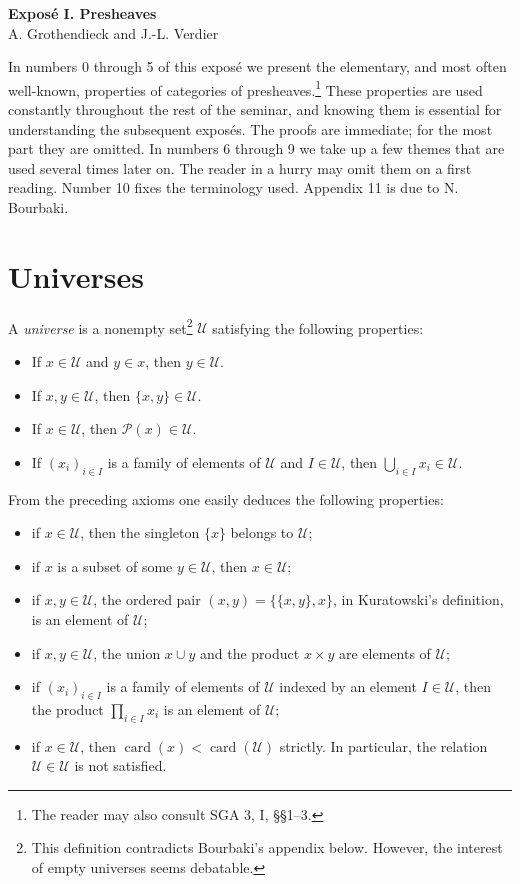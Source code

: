 \documentclass[11pt]{article}
\newcommand{\U}{\mathcal{U}}
\newcommand{\card}{\operatorname{card}}
\newcommand{\Pow}{\mathcal{P}}
\theoremstyle{definition}
\begin{document}
\begin{center}
{\Large \textbf{Exposé I. Presheaves}}\\[0.5em]
A. Grothendieck and J.-L. Verdier
\end{center}

\bigskip

In numbers 0 through 5 of this exposé we present the elementary, and most often well-known, properties of categories of presheaves.\footnote{The reader may also consult SGA 3, I, \S\S 1--3.} These properties are used constantly throughout the rest of the seminar, and knowing them is essential for understanding the subsequent exposés. The proofs are immediate; for the most part they are omitted. In numbers 6 through 9 we take up a few themes that are used several times later on. The reader in a hurry may omit them on a first reading. Number 10 fixes the terminology used. Appendix 11 is due to N. Bourbaki.

\section{Universes}

A \emph{universe} is a nonempty set\footnote{This definition contradicts Bourbaki's appendix below. However, the interest of empty universes seems debatable.} $\U$ satisfying the following properties:
\begin{itemize}
\item[($\U$1)] If $x\in \U$ and $y\in x$, then $y\in \U$.
\item[($\U$2)] If $x,y\in \U$, then $\{x,y\}\in \U$.
\item[($\U$3)] If $x\in \U$, then $\Pow(x)\in \U$.
\item[($\U$4)] If $(x_i)_{i\in I}$ is a family of elements of $\U$ and $I\in\U$, then $\bigcup_{i\in I}x_i\in \U$.
\end{itemize}

From the preceding axioms one easily deduces the following properties:
\begin{itemize}
\item if $x\in \U$, then the singleton $\{x\}$ belongs to $\U$;
\item if $x$ is a subset of some $y\in \U$, then $x\in \U$;
\item if $x,y\in \U$, the ordered pair $(x,y)=\{\{x,y\},x\}$, in Kuratowski's definition, is an element of $\U$;
\item if $x,y\in \U$, the union $x\cup y$ and the product $x\times y$ are elements of $\U$;
\item if $(x_i)_{i\in I}$ is a family of elements of $\U$ indexed by an element $I\in \U$, then the product $\prod_{i\in I}x_i$ is an element of $\U$;
\item if $x\in \U$, then $\card(x)<\card(\U)$ strictly. In particular, the relation $\U\in \U$ is not satisfied.
\end{itemize}
\end{document}
